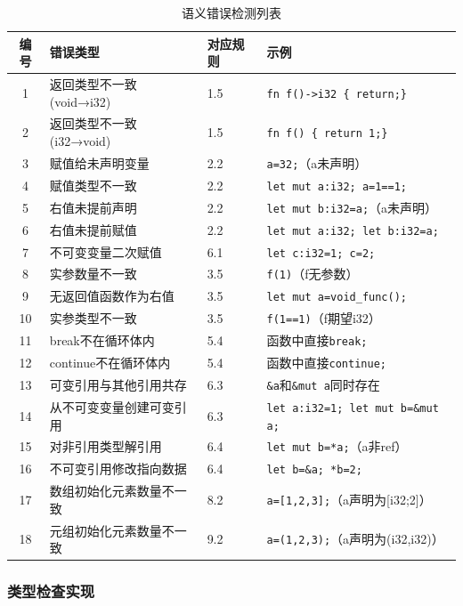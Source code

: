 \documentclass[12pt,a4paper]{ctexart}
\begin{document}
\begin{table}[!htp]
\centering
\caption{语义错误检测列表}
\label{tab:semantic_errors}
\begin{tabular}{|c|l|l|l|}
\hline
\textbf{编号} & \textbf{错误类型} & \textbf{对应规则} & \textbf{示例} \\
\hline
1 & 返回类型不一致 (void→i32) & 1.5 & \texttt{fn f()->i32 \{ return;\}} \\
\hline
2 & 返回类型不一致 (i32→void) & 1.5 & \texttt{fn f() \{ return 1;\}} \\
\hline
3 & 赋值给未声明变量 & 2.2 & \texttt{a=32;}（a未声明） \\
\hline
4 & 赋值类型不一致 & 2.2 & \texttt{let mut a:i32; a=1==1;} \\
\hline
5 & 右值未提前声明 & 2.2 & \texttt{let mut b:i32=a;}（a未声明） \\
\hline
6 & 右值未提前赋值 & 2.2 & \texttt{let mut a:i32; let b:i32=a;} \\
\hline
7 & 不可变变量二次赋值 & 6.1 & \texttt{let c:i32=1; c=2;} \\
\hline
8 & 实参数量不一致 & 3.5 & \texttt{f(1)}（f无参数） \\
\hline
9 & 无返回值函数作为右值 & 3.5 & \texttt{let mut a=void\_func();} \\
\hline
10 & 实参类型不一致 & 3.5 & \texttt{f(1==1)}（f期望i32） \\
\hline
11 & break不在循环体内 & 5.4 & 函数中直接\texttt{break;} \\
\hline
12 & continue不在循环体内 & 5.4 & 函数中直接\texttt{continue;} \\
\hline
13 & 可变引用与其他引用共存 & 6.3 & \texttt{\&a}和\texttt{\&mut a}同时存在 \\
\hline
14 & 从不可变变量创建可变引用 & 6.3 & \texttt{let a:i32=1; let mut b=\&mut a;} \\
\hline
15 & 对非引用类型解引用 & 6.4 & \texttt{let mut b=*a;}（a非ref） \\
\hline
16 & 不可变引用修改指向数据 & 6.4 & \texttt{let b=\&a; *b=2;} \\
\hline
17 & 数组初始化元素数量不一致 & 8.2 & \texttt{a=[1,2,3];}（a声明为[i32;2]） \\
\hline
18 & 元组初始化元素数量不一致 & 9.2 & \texttt{a=(1,2,3);}（a声明为(i32,i32)） \\
\hline
\end{tabular}
\end{table}

\subsubsection{类型检查实现}
\end{document}
